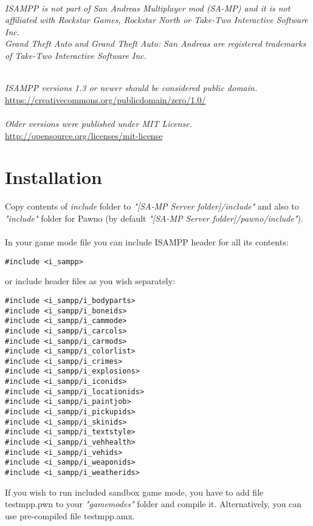 \documentclass{article}
\begin{document}
\textit{\\ISAMPP is not part of San Andreas Multiplayer mod (SA-MP) and it is not affiliated with Rockstar Games, Rockstar North or Take-Two Interactive Software Inc.}
\textit{\\Grand Theft Auto and Grand Theft Auto: San Andreas are registered trademarks of Take-Two Interactive Software Inc.}

\textit{\\ISAMPP versions 1.3 or newer should be considered public domain.}
\\\url{https://creativecommons.org/publicdomain/zero/1.0/}
\\
\\\textit{Older versions were published under MIT License.}
\\\url{http://opensource.org/licenses/mit-license}

\section{Installation}
Copy contents of \textit{include} folder to \textit{"[SA-MP Server folder]/include"} and also to \textit{"include"} folder for Pawno (by default \textit{"[SA-MP Server folder]/pawno/include"}).
\\
\\
In your game mode file you can include ISAMPP header for all its contents:
\begin{verbatim}
#include <i_sampp>
\end{verbatim}
or include header files as you wish separately:
\begin{verbatim}
#include <i_sampp/i_bodyparts>
#include <i_sampp/i_boneids>
#include <i_sampp/i_cammode>
#include <i_sampp/i_carcols>
#include <i_sampp/i_carmods>
#include <i_sampp/i_colorlist>
#include <i_sampp/i_crimes>
#include <i_sampp/i_explosions>
#include <i_sampp/i_iconids>
#include <i_sampp/i_locationids>
#include <i_sampp/i_paintjob>
#include <i_sampp/i_pickupids>
#include <i_sampp/i_skinids>
#include <i_sampp/i_textstyle>
#include <i_sampp/i_vehhealth>
#include <i_sampp/i_vehids>
#include <i_sampp/i_weaponids>
#include <i_sampp/i_weatherids>
\end{verbatim}
If you wish to run included sandbox game mode, you have to add file testmpp.pwn to your \textit{"gamemodes"} folder and compile it. Alternatively, you can use pre-compiled file testmpp.amx.

\newpage
\end{document}
